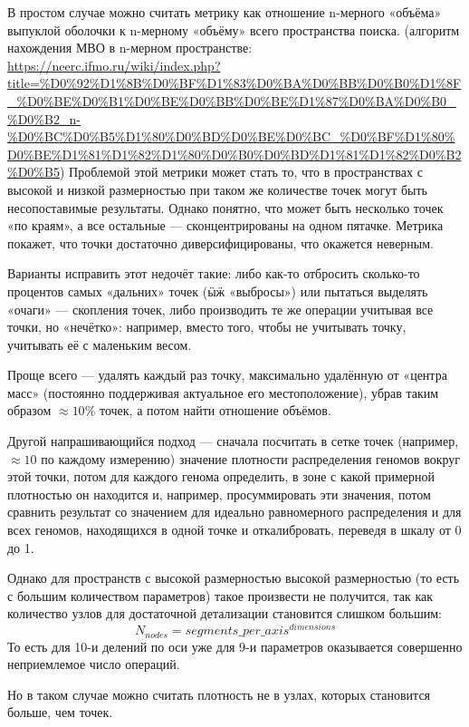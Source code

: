 В простом случае можно считать метрику как отношение n-мерного «объёма» выпуклой оболочки к n-мерному «объёму» всего пространства поиска.
(алгоритм нахождения МВО в n-мерном пространстве: \url{https://neerc.ifmo.ru/wiki/index.php?title=%D0%92%D1%8B%D0%BF%D1%83%D0%BA%D0%BB%D0%B0%D1%8F_%D0%BE%D0%B1%D0%BE%D0%BB%D0%BE%D1%87%D0%BA%D0%B0_%D0%B2_n-%D0%BC%D0%B5%D1%80%D0%BD%D0%BE%D0%BC_%D0%BF%D1%80%D0%BE%D1%81%D1%82%D1%80%D0%B0%D0%BD%D1%81%D1%82%D0%B2%D0%B5})
Проблемой этой метрики может стать то, что в пространствах с высокой и низкой  размерностью при таком же количестве точек могут быть несопоставимые результаты.
Однако понятно, что может быть несколько точек «по краям», а все остальные — сконцентрированы на одном пятачке.
Метрика покажет, что точки достаточно диверсифицированы, что окажется неверным.

Варианты исправить этот недочёт такие:
либо как-то отбросить сколько-то процентов самых «дальних» точек (ӹӝ «выбросы») или пытаться выделять «очаги» — скопления точек,
либо производить те же операции учитывая все точки, но «нечётко»: например, вместо того, чтобы не учитывать точку, учитывать её с маленьким весом.

Проще всего — удалять каждый раз точку, максимально удалённую от «центра масс» (постоянно поддерживая актуальное его местоположение),
убрав таким образом $\approx 10\%$ точек, а потом найти отношение объёмов.

Другой напрашивающийся подход — сначала посчитать в сетке точек (например, $\approx 10$ по каждому измерению)
значение плотности распределения геномов вокруг этой точки, потом для каждого генома определить, в зоне с какой примерной плотностью он находится и, например, просуммировать эти значения,
потом сравнить результат со значением для идеально равномерного распределения и для всех геномов, находящихся в одной точке и откалибровать, переведя в шкалу от 0 до 1.

Однако для пространств с высокой размерностью высокой размерностью (то есть с большим количеством параметров) такое произвести не получится, так как количество узлов
для достаточной детализации становится слишком большим:
\begin{equation}
    N_{nodes} = segments\_per\_axis^{dimensions}
\end{equation}
То есть для 10-и делений по оси уже для 9-и параметров оказывается совершенно неприемлемое число операций.

Но в таком случае можно считать плотность не в узлах, которых становится больше, чем точек.

